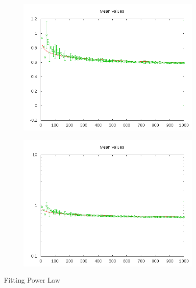 \documentclass[10pt]{article}
\begin{document}
\begin{figure}[htb!]
\begin{subfigure}{.5\textwidth}
  \centering
  \includegraphics[width=1\linewidth]{../Results/wErrorbars_Power_PlanarMean.png}
\end{subfigure}%
\begin{subfigure}{.5\textwidth}
  \centering
  \includegraphics[width=1\linewidth]{../Results/wErrorbars_Power_PlanarMean_NoLogscale.png}
\end{subfigure}
  \caption{Fitting Power Law}
\label{fig:planarMean}
\end{figure}
\end{document}
